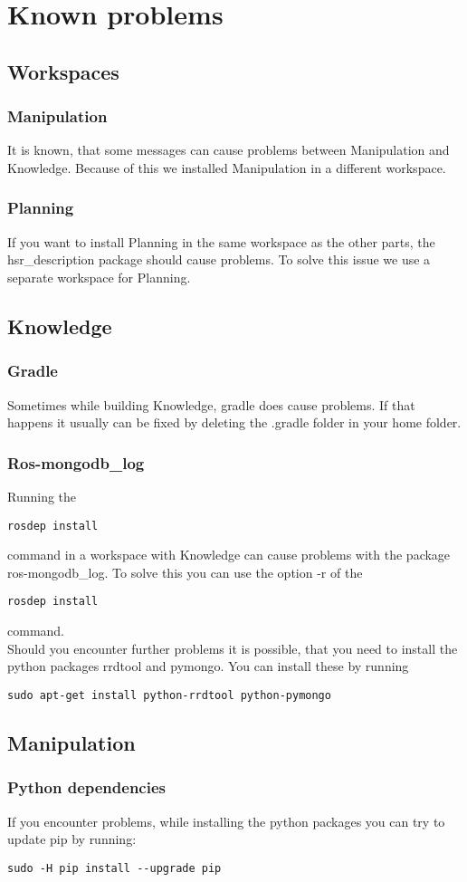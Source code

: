 \documentclass[main.tex]{subfiles}
\begin{document}
	\section{Known problems}

	\subsection{Workspaces}
	\subsubsection{Manipulation}
	It is known, that some messages can cause problems between Manipulation and Knowledge. Because of this we installed Manipulation in a different workspace.
	
	\subsubsection{Planning}
	If you want to install Planning in the same workspace as the other parts, the hsr\_description package should cause problems. To solve this issue we use a separate workspace for Planning.
	

	\subsection{Knowledge}
	\subsubsection{Gradle}
	Sometimes while building Knowledge, gradle does cause problems.
	If that happens it usually can be fixed by deleting the .gradle folder in your home folder.
	
	\subsubsection{Ros-mongodb\_log}
	Running the 
	\begin{lstlisting}
rosdep install
\end{lstlisting}
command in a workspace with Knowledge can cause problems with the package ros-mongodb\_log. To solve this you can use the option -r of the 
\begin{lstlisting}
rosdep install
\end{lstlisting}
command.\\
Should you encounter further problems it is possible, that you need to install the  python packages rrdtool and pymongo. You can install these by running
\begin{lstlisting}
sudo apt-get install python-rrdtool python-pymongo
\end{lstlisting}
	
	\subsection{Manipulation}
	\subsubsection{Python dependencies}
	If you encounter problems, while installing the python packages you can try to update pip by running:
	\begin{lstlisting}
sudo -H pip install --upgrade pip
\end{lstlisting}	
	
\end{document}
